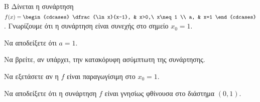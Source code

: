 \begin{thema}{Β}
Δίνεται η συνάρτηση $f(x) = \begin{cdcases} \dfrac{\ln x}{x-1}, & x>0,\ x\neq1 \\ a, & x=1 \end{cdcases}$. Γνωρίζουμε ότι η συνάρτηση είναι συνεχής στο σημείο $x_0=1$.
\begin{erwthma}
  \item Να αποδείξετε ότι $a=1$.
  \item Να βρείτε, αν υπάρχει, την κατακόρυφη ασύμπτωτη της συνάρτησης.
  \item Να εξετάσετε αν η $f$ είναι παραγωγίσιμη στο $x_0=1$.
  \item Να αποδείξετε ότι η συνάρτηση $f$ είναι γνησίως φθίνουσα στο διάστημα $(0, 1)$.
\end{erwthma}
\end{thema}
